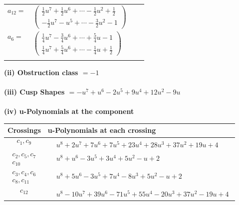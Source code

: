 \documentclass[1p]{elsarticle_modified}
\theoremstyle{definition}
\begin{document}
\begin{tabular}{m{7pt} m{180pt} m{7pt} m{180pt} }
\flushright $a_{12}=$&$\begin{pmatrix}\frac{1}{2} u^7+\frac{1}{2} u^6+\cdots-\frac{1}{2} u^2+\frac{1}{2}\\-\frac{1}{2} u^7- u^5+\cdots-\frac{3}{2} u^2-1\end{pmatrix}$ \\
\flushright $a_{6}=$&$\begin{pmatrix}\frac{1}{4} u^7-\frac{3}{4} u^6+\cdots+\frac{5}{4} u-1\\\frac{1}{4} u^7+\frac{5}{4} u^6+\cdots-\frac{1}{4} u+\frac{1}{2}\end{pmatrix}$\\&\end{tabular}
\flushleft \textbf{(ii) Obstruction class $= -1$}\\~\\
\flushleft \textbf{(iii) Cusp Shapes $= - u^7+u^6-2 u^5+9 u^4+12 u^2-9 u$}\\~\\
\newpage\renewcommand{\arraystretch}{1}
\flushleft \textbf{(iv) u-Polynomials at the component}\newline \\
\begin{tabular}{m{50pt}|m{274pt}}
Crossings & \hspace{64pt}u-Polynomials at each crossing \\
\hline $$\begin{aligned}c_{1},c_{9}\end{aligned}$$&$\begin{aligned}
&u^8+2 u^7+7 u^6+7 u^5+23 u^4+28 u^3+37 u^2+19 u+4
\end{aligned}$\\
\hline $$\begin{aligned}c_{2},c_{5},c_{7}\\c_{10}\end{aligned}$$&$\begin{aligned}
&u^8+u^6-3 u^5+3 u^4+5 u^2- u+2
\end{aligned}$\\
\hline $$\begin{aligned}c_{3},c_{4},c_{6}\\c_{8},c_{11}\end{aligned}$$&$\begin{aligned}
&u^8+5 u^6-3 u^5+7 u^4-8 u^3+5 u^2- u+2
\end{aligned}$\\
\hline $$\begin{aligned}c_{12}\end{aligned}$$&$\begin{aligned}
&u^8-10 u^7+39 u^6-71 u^5+55 u^4-20 u^3+37 u^2-19 u+4
\end{aligned}$\\
\hline
\end{tabular}\\~\\
\end{document}
